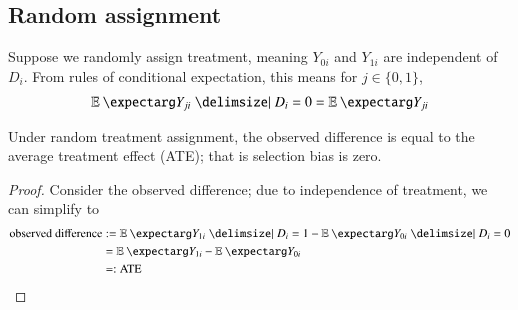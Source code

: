         \subsection{Random assignment}
            Suppose we randomly assign treatment, meaning $Y_{0i}$ and $Y_{1i}$ are independent of $D_i$. From rules of conditional expectation, this means for $j\in\{0,1\}$,
            \begin{align}
                \expect{Y_{ji} | D_i = 0} = \expect{Y_{ji}}
            \end{align}

            \begin{theorem}
                Under random treatment assignment, the observed difference is equal to the average treatment effect (ATE); that is selection bias is zero.
            \end{theorem}
            \begin{proof}
                Consider the observed difference; due to independence of treatment, we can simplify to
                \begin{align*}
                    \text{observed difference}
                        &:= \expect{Y_{1i}|D_i=1} - \expect{Y_{0i}|D_i=0}   \\
                        &= \expect{Y_{1i}} - \expect{Y_{0i}}    \\
                        &=: \mathrm{ATE}
                \end{align*}
            \end{proof}
            
